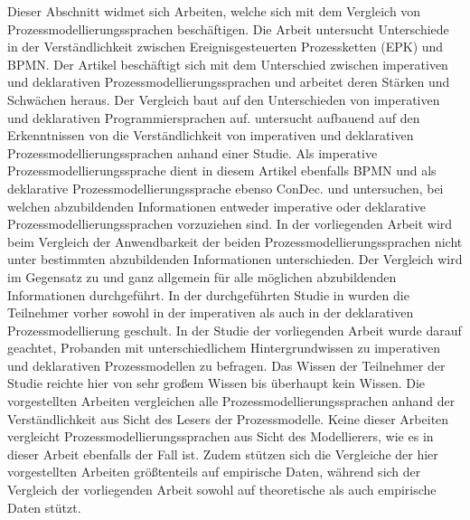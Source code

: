Dieser Abschnitt widmet sich Arbeiten, welche sich mit dem Vergleich von Prozessmodellierungssprachen beschäftigen.\newline
Die Arbeit \cite{recker2007does} untersucht Unterschiede in der Verständlichkeit zwischen Ereignisgesteuerten Prozessketten (EPK) und BPMN.\newline
Der Artikel \cite{fahland2010} beschäftigt sich mit dem Unterschied zwischen imperativen und deklarativen Prozessmodellierungssprachen und arbeitet deren Stärken und Schwächen heraus. Der Vergleich baut auf den Unterschieden von imperativen und deklarativen Programmiersprachen auf. \newline
\cite{pichler2012} untersucht aufbauend auf den Erkenntnissen von \cite{fahland2010} die Verständlichkeit von imperativen und deklarativen Prozessmodellierungssprachen anhand einer Studie. Als imperative Prozessmodellierungssprache dient in diesem Artikel ebenfalls BPMN und als deklarative Prozessmodellierungssprache ebenso ConDec. \newline 
\cite{fahland2010} und \cite{pichler2012} untersuchen, bei welchen abzubildenden Informationen entweder imperative oder deklarative Prozessmodellierungssprachen vorzuziehen sind. In der vorliegenden Arbeit wird beim Vergleich der Anwendbarkeit der beiden Prozessmodellierungssprachen nicht unter bestimmten abzubildenden Informationen unterschieden. Der Vergleich wird im Gegensatz zu \cite{fahland2010} und \cite{pichler2012}  ganz allgemein für alle möglichen abzubildenden Informationen durchgeführt. \newline
In der durchgeführten Studie in \cite{pichler2012} wurden die Teilnehmer vorher sowohl in der imperativen als auch in der deklarativen Prozessmodellierung geschult. In der Studie der vorliegenden Arbeit wurde darauf geachtet, Probanden mit unterschiedlichem Hintergrundwissen zu imperativen und deklarativen Prozessmodellen zu befragen. Das Wissen der Teilnehmer der Studie reichte hier von sehr großem Wissen bis überhaupt kein Wissen.\newline
Die vorgestellten Arbeiten vergleichen alle Prozessmodellierungssprachen anhand der Verständlichkeit aus Sicht des Lesers der Prozessmodelle. Keine dieser Arbeiten vergleicht Prozessmodellierungssprachen aus Sicht des Modellierers, wie es in dieser Arbeit ebenfalls der Fall ist. Zudem stützen sich die Vergleiche der hier vorgestellten Arbeiten größtenteils auf empirische Daten, während sich der Vergleich der vorliegenden Arbeit sowohl auf theoretische als auch empirische Daten stützt.



